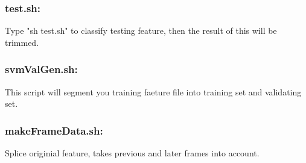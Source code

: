 \documentclass[10pt,a4paper]{article}
\begin{document}
\subsubsection*{test.sh:}
Type "sh test.sh" to classify testing feature, then the result of this will be trimmed.
\subsubsection*{svmValGen.sh:}
This script will segment you training faeture file into training set and validating set.
\subsubsection*{makeFrameData.sh:}
Splice originial feature, takes previous and later frames into account.
\end{document}
